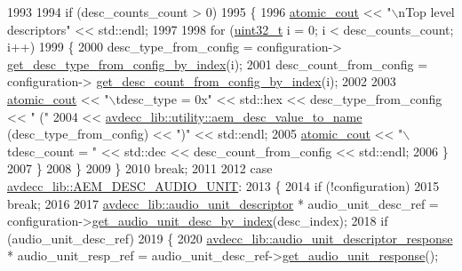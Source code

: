 \begin{DoxyCode}
1993 
1994             \textcolor{keywordflow}{if} (desc\_counts\_count > 0)
1995             \{
1996                 \hyperlink{cmd__line_8h_a0bc38ccc65c79ba06c6fcd7b4bf554c3}{atomic\_cout} << \textcolor{stringliteral}{"\(\backslash\)nTop level descriptors"} << std::endl;
1997 
1998                 \textcolor{keywordflow}{for} (\hyperlink{parse_8c_a6eb1e68cc391dd753bc8ce896dbb8315}{uint32\_t} i = 0; i < desc\_counts\_count; i++)
1999                 \{
2000                     desc\_type\_from\_config = configuration->
      \hyperlink{classavdecc__lib_1_1configuration__descriptor_a2bb7fa704062891fa5dec1af9c3bd584}{get\_desc\_type\_from\_config\_by\_index}(i);
2001                     desc\_count\_from\_config = configuration->
      \hyperlink{classavdecc__lib_1_1configuration__descriptor_a08425469ea1f3148c9d5df195225c351}{get\_desc\_count\_from\_config\_by\_index}(i);
2002 
2003                     \hyperlink{cmd__line_8h_a0bc38ccc65c79ba06c6fcd7b4bf554c3}{atomic\_cout} << \textcolor{stringliteral}{"\(\backslash\)tdesc\_type = 0x"} << std::hex << desc\_type\_from\_config << \textcolor{stringliteral}{"
       ("}
2004                                 << \hyperlink{namespaceavdecc__lib_1_1utility_a6bdd02679e5a911a071d4aa03be341f0}{avdecc\_lib::utility::aem\_desc\_value\_to\_name}
      (desc\_type\_from\_config) << \textcolor{stringliteral}{")"} << std::endl;
2005                     \hyperlink{cmd__line_8h_a0bc38ccc65c79ba06c6fcd7b4bf554c3}{atomic\_cout} << \textcolor{stringliteral}{"\(\backslash\)tdesc\_count = "} << std::dec << desc\_count\_from\_config << 
      std::endl;
2006                 \}
2007             \}
2008         \}
2009     \}
2010     \textcolor{keywordflow}{break};
2011 
2012     \textcolor{keywordflow}{case} \hyperlink{namespaceavdecc__lib_ac7b7d227e46bc72b63ee9e9aae15902fa141a799bfb339b5ff7543722da1119e2}{avdecc\_lib::AEM\_DESC\_AUDIO\_UNIT}:
2013     \{
2014         \textcolor{keywordflow}{if} (!configuration)
2015             \textcolor{keywordflow}{break};
2016 
2017         \hyperlink{classavdecc__lib_1_1audio__unit__descriptor}{avdecc\_lib::audio\_unit\_descriptor} * audio\_unit\_desc\_ref = 
      configuration->\hyperlink{classavdecc__lib_1_1configuration__descriptor_aa723a66eba00ad8c8f5361951f5af6e7}{get\_audio\_unit\_desc\_by\_index}(desc\_index);
2018         \textcolor{keywordflow}{if} (audio\_unit\_desc\_ref)
2019         \{
2020             \hyperlink{classavdecc__lib_1_1audio__unit__descriptor__response}{avdecc\_lib::audio\_unit\_descriptor\_response} * 
      audio\_unit\_resp\_ref = audio\_unit\_desc\_ref->\hyperlink{classavdecc__lib_1_1audio__unit__descriptor_a1bc85ccfad8fa58cab10f58a6797919d}{get\_audio\_unit\_response}();

\end{DoxyCode}
